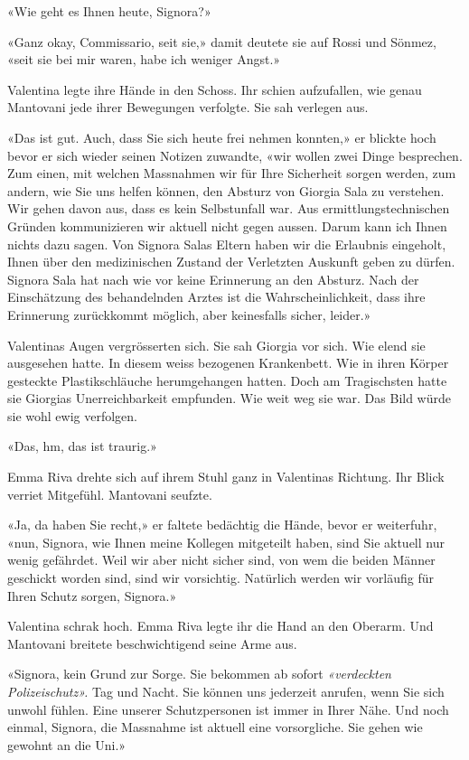 «Wie geht es Ihnen heute, Signora?»

«Ganz okay, Commissario, seit sie,» damit deutete sie auf Rossi und
Sönmez, «seit sie bei mir waren, habe ich weniger Angst.»

Valentina legte ihre Hände in den Schoss. Ihr schien aufzufallen, wie
genau Mantovani jede ihrer Bewegungen verfolgte. Sie sah verlegen aus.

«Das ist gut. Auch, dass Sie sich heute frei nehmen konnten,» er blickte
hoch bevor er sich wieder seinen Notizen zuwandte, «wir wollen zwei
Dinge besprechen. Zum einen, mit welchen Massnahmen wir für Ihre
Sicherheit sorgen werden, zum andern, wie Sie uns helfen können, den
Absturz von Giorgia Sala zu verstehen. Wir gehen davon aus, dass es kein
Selbstunfall war. Aus ermittlungstechnischen Gründen kommunizieren wir
aktuell nicht gegen aussen. Darum kann ich Ihnen nichts dazu sagen. Von Signora Salas Eltern haben wir 
die Erlaubnis eingeholt, Ihnen über den medizinischen Zustand der Verletzten Auskunft geben zu dürfen.
Signora Sala hat nach wie vor keine Erinnerung an den Absturz. Nach der
Einschätzung des behandelnden Arztes ist die Wahrscheinlichkeit, dass
ihre Erinnerung zurückkommt möglich, aber keinesfalls sicher, leider.»

Valentinas Augen vergrösserten sich. Sie sah Giorgia vor sich. Wie elend 
sie ausgesehen hatte. In diesem weiss bezogenen Krankenbett. Wie in ihren Körper gesteckte
Plastikschläuche herumgehangen hatten. Doch am Tragischsten
hatte sie Giorgias Unerreichbarkeit empfunden. Wie weit weg sie war. Das
Bild würde sie wohl ewig verfolgen.

«Das, hm, das ist traurig.»

Emma Riva drehte sich auf ihrem Stuhl ganz in Valentinas Richtung. Ihr
Blick verriet Mitgefühl. Mantovani seufzte.

«Ja, da haben Sie recht,» er faltete bedächtig die Hände, bevor er
weiterfuhr, «nun, Signora, wie Ihnen meine Kollegen mitgeteilt haben,
sind Sie aktuell nur wenig gefährdet. Weil wir aber nicht sicher
sind, von wem die beiden Männer geschickt worden sind, sind wir vorsichtig. 
Natürlich werden wir vorläufig für Ihren Schutz sorgen, Signora.»

Valentina schrak hoch. Emma Riva legte ihr die Hand an
den Oberarm. Und Mantovani breitete beschwichtigend seine Arme aus.

«Signora, kein Grund zur Sorge. Sie bekommen ab sofort \emph{«verdeckten
Polizeischutz».} Tag und Nacht. Sie können uns jederzeit anrufen, wenn
Sie sich unwohl fühlen. Eine unserer Schutzpersonen ist immer in
Ihrer Nähe. Und noch einmal, Signora, die Massnahme ist aktuell eine
vorsorgliche. Sie gehen wie gewohnt an die Uni.»

